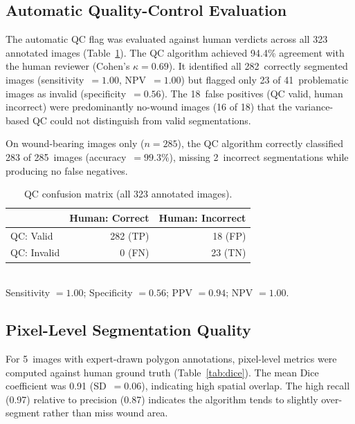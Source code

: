 \subsection{Automatic Quality-Control Evaluation}

The automatic QC flag was evaluated against human verdicts across all 323 annotated images (Table~\ref{tab:qc_confusion}). The QC algorithm achieved 94.4\% agreement with the human reviewer (Cohen's $\kappa = 0.69$). It identified all 282~correctly segmented images (sensitivity~$= 1.00$, NPV~$= 1.00$) but flagged only 23 of 41~problematic images as invalid (specificity~$= 0.56$). The 18~false positives (QC valid, human incorrect) were predominantly no-wound images (16 of 18) that the variance-based QC could not distinguish from valid segmentations.

On wound-bearing images only ($n = 285$), the QC algorithm correctly classified 283 of 285~images (accuracy~$= 99.3\%$), missing 2~incorrect segmentations while producing no false negatives.

\begin{table}[t]
  \centering
  \caption{QC confusion matrix (all 323 annotated images).}\label{tab:qc_confusion}
  \begin{tabular}{lrr}
    \toprule
    & Human: Correct & Human: Incorrect \\
    \midrule
    QC: Valid   & 282 (TP) & 18 (FP) \\
    QC: Invalid &   0 (FN) & 23 (TN) \\
    \bottomrule
  \end{tabular}
  \smallskip\\
  {\small Sensitivity $= 1.00$; Specificity $= 0.56$; PPV $= 0.94$; NPV $= 1.00$.}
\end{table}

\subsection{Pixel-Level Segmentation Quality}

For 5~images with expert-drawn polygon annotations, pixel-level metrics were computed against human ground truth (Table~\ref{tab:dice}). The mean Dice coefficient was 0.91 (SD~$= 0.06$), indicating high spatial overlap. The high recall (0.97) relative to precision (0.87) indicates the algorithm tends to slightly over-segment rather than miss wound area.

